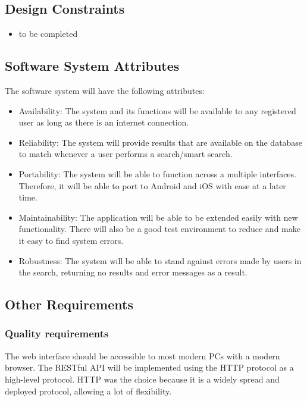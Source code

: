 \documentclass[a4paper,10pt]{article}
\begin{document}
	\subsection{Design Constraints}
	\begin{itemize}
		\item to be completed
	\end{itemize}

	\subsection{Software System Attributes}
	The software system will have the following attributes:
		\begin{itemize}
		\item Availability: The system and its functions will be available to any registered user as long as there is an internet connection. 
		\item Reliability: The system will provide results that are available on the database to match whenever a user performs a search/smart search.
		\item Portability: The system will be able to function across a multiple interfaces. Therefore, it will be able to port to Android and iOS with ease at a later time. 
		\item Maintainability: The application will be able to be extended easily with new functionality. There will also be a good test environment to reduce and make it easy to find system errors.  
		\item Robustness: The system will be able to stand against errors made by users in the search, returning no results and error messages as a result.
		\end{itemize}
        
	\subsection{Other Requirements}

\subsubsection{Quality requirements}
The web interface should be accessible to most modern PCs with a modern browser.
The RESTful API will be implemented using the HTTP protocol as a high-level protocol. HTTP was the choice because it is a widely spread and deployed protocol, allowing a lot of flexibility. 
\end{document}
